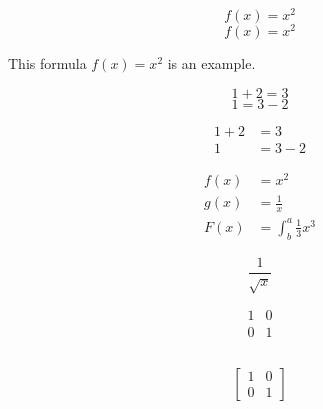 \documentclass{article}
\begin{document}
\begin{equation}
f(x) = x^2
\end{equation}
\begin{equation*}
f(x) = x^2
\end{equation*}


\newpage


This formula $f(x) = x^2$ is an example.

\begin{equation*}
1 + 2 = 3
\end{equation*}
\begin{equation*}
1 = 3 - 2
\end{equation*}

\begin{align*}
1 + 2 &= 3\\
1 &= 3 - 2
\end{align*}

\begin{align*}
    f(x) &= x^2\\
    g(x) &= \frac{1}{x}\\
    F(x) &= \int^a_b \frac{1}{3}x^3
\end{align*}

\begin{equation}
    \frac{1}{\sqrt{x}}
\end{equation}

\begin{equation*}
    \begin{matrix}
        1 & 0\\
        0 & 1
    \end{matrix}
\end{equation*}

\begin{equation*}
    [
    \begin{matrix}
    1 & 0\\
    0 & 1
    \end{matrix}
    ]
\end{equation*}

\begin{equation*}
    \left[
    \begin{matrix}
        1 & 0\\
        0 & 1
    \end{matrix}
    \right]
\end{equation*}
\end{document}
